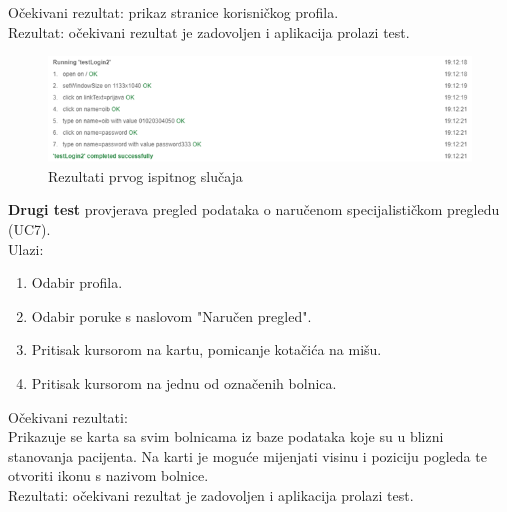 			\noindent Očekivani rezultat: prikaz stranice korisničkog profila.\\
			Rezultat: očekivani rezultat je zadovoljen i aplikacija prolazi test.
			
			\begin{figure}[H]
				\includegraphics[width=\textwidth]{slike/prijavaUSustav.PNG} %
				\caption{Rezultati prvog ispitnog slučaja}
				\label{fig:prijavaTest} %
			\end{figure}
			\eject 
		
		\noindent \textbf{Drugi test} provjerava pregled podataka o naručenom specijalističkom pregledu (UC7). \\
			Ulazi: 
		\begin{enumerate}
			\item Odabir profila.
			\item Odabir poruke s naslovom "Naručen pregled".
			\item Pritisak kursorom na kartu, pomicanje kotačića na mišu.
			\item Pritisak kursorom na jednu od označenih bolnica.
		\end{enumerate}
		
		\noindent Očekivani rezultati:\\ Prikazuje se karta sa svim bolnicama iz baze podataka koje su u blizni stanovanja pacijenta. Na karti je moguće mijenjati visinu i poziciju pogleda te otvoriti ikonu s nazivom bolnice.\\
		Rezultati: očekivani rezultat je zadovoljen i aplikacija prolazi test.
		
